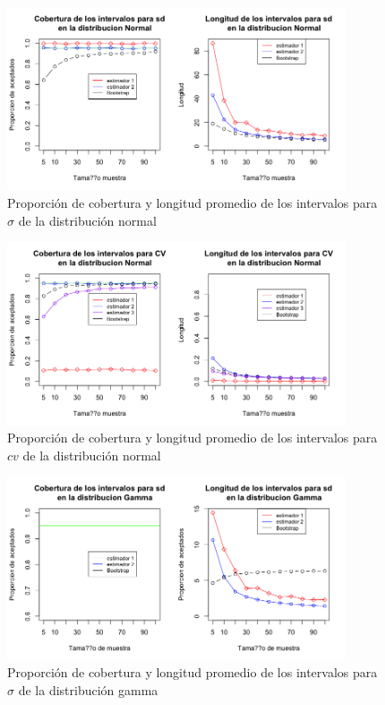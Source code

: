 \documentclass[letterpaper,12pt,onecolumn,titlepage]{article}
\begin{document}
\begin{figure}[!h]
    \begin{center}
        \includegraphics[width=10cm]{Figuras/Rplot.png}
        \caption{Proporci\'{o}n de cobertura y longitud promedio de los intervalos para $\sigma$ de la distribuci\'{o}n normal}
        \label{fig:Densidad}
    \end{center}
\end{figure}

\begin{figure}[!h]
    \begin{center}
        \includegraphics[width=10cm]{Figuras/Rplot01.png}
        \caption{Proporci\'{o}n de cobertura y longitud promedio de los intervalos para $cv$ de la distribuci\'{o}n normal}
        \label{fig:Densidad}
    \end{center}
\end{figure}

\begin{figure}[!h]
    \begin{center}
        \includegraphics[width=10cm]{Figuras/Rplot02.png}
        \caption{Proporci\'{o}n de cobertura y longitud promedio de los intervalos para $\sigma$ de la distribuci\'{o}n gamma}
        \label{fig:Densidad}
    \end{center}
\end{figure}
\end{document}
